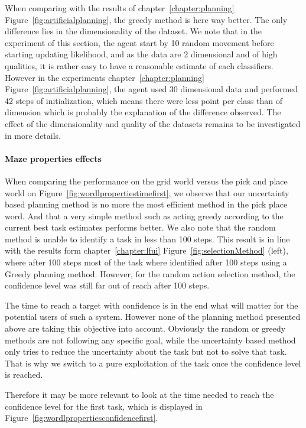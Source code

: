 When comparing with the results of chapter~\ref{chapter:planning} Figure~\ref{fig:artificialplanning}, the greedy method is here way better. The only difference lies in the dimensionality of the dataset. We note that in the experiment of this section, the agent start by 10 random movement before starting updating likelihood, and as the data are 2 dimensional and of high qualities, it is rather easy to have a reasonable estimate of each classifiers. However in the experiments  chapter~\ref{chapter:planning} Figure~\ref{fig:artificialplanning}, the agent used 30 dimensional data and performed 42 steps of initialization, which means there were less point per class than of dimension which is probably the explanation of the difference observed. The effect of the dimensionality and quality of the datasets remains to be investigated in more details.

\paragraph{Maze properties effects}

When comparing the performance on the grid world versus the pick and place world on Figure~\ref{fig:wordlpropertiestimefirst}, we observe that our uncertainty based planning method is no more the most efficient method in the pick place word. And that a very simple method such as acting greedy according to the current best task estimates performs better. We also note that the random method is unable to identify a task in less than 100 steps. This result is in line with the results form chapter~\ref{chapter:lfui} Figure~\ref{fig:selectionMethod} (left), where after 100 steps most of the task where identified after 100 steps using a Greedy planning method. However, for the random action selection method, the confidence level was still far out of reach after 100 steps.

The time to reach a target with confidence is in the end what will matter for the potential users of such a system. However none of the planning method presented above are taking this objective into account. Obviously the random or greedy methods are not following any specific goal, while the uncertainty based method only tries to reduce the uncertainty about the task but not to solve that task. That is why we switch to a pure exploitation of the task once the confidence level is reached.

Therefore it may be more relevant to look at the time needed to reach the confidence level for the first task, which is displayed in Figure~\ref{fig:wordlpropertiesconfidencefirst}.

